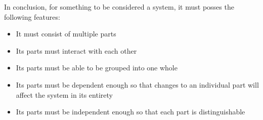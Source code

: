 \documentclass[11pt]{article}
\begin{document}
\par In conclusion, for something to be considered a system, it must posses the following features:
\begin{itemize}
\item It must consist of multiple parts
\item Its parts must interact with each other
\item Its parts must be able to be grouped into one whole
\item Its parts must be dependent enough so that changes to an individual part will affect the system in its entirety
\item Its parts must be independent enough so that each part is distinguishable
\end{itemize}








	





	








\end{document}
